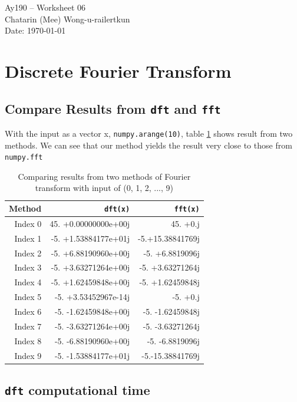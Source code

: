 \documentclass[11pt,letterpaper]{article}
\begin{document}
\begin{center}
\Large
Ay190 -- Worksheet 06 \\    %
Chatarin (Mee) Wong-u-railertkun\\
Date: \today
\end{center}

\section{Discrete Fourier Transform}

\subsection{Compare Results from \texttt{dft} and \texttt{fft}}
With the input as a vector x, \texttt{numpy.arange(10)}, table \ref{tab:compare} shows result from two methods. We can see that our method yields the result very close to those from \texttt{numpy.fft}

\begin{table}[h!]
	\centering
	\begin{tabular}{r || r | r}
		Method & \texttt{dft(x)} & \texttt{fft(x)} \\
		\hline
		\hline
		Index 0 & 45. +0.00000000e+00j & 45. +0.j \\
		Index 1 & -5. +1.53884177e+01j & -5.+15.38841769j \\
		Index 2 & -5. +6.88190960e+00j & -5. +6.8819096j \\
		Index 3 & -5. +3.63271264e+00j & -5. +3.63271264j \\
		Index 4 & -5. +1.62459848e+00j & -5. +1.62459848j \\
		Index 5 & -5. +3.53452967e-14j & -5. +0.j \\
		Index 6 & -5. -1.62459848e+00j & -5. -1.62459848j \\
		Index 7 & -5. -3.63271264e+00j & -5. -3.63271264j \\
		Index 8 & -5. -6.88190960e+00j & -5. -6.8819096j \\
		Index 9 & -5. -1.53884177e+01j & -5.-15.38841769j \\
		\hline
	\end{tabular}
	\caption{Comparing results from two methods of Fourier transform with input of (0, 1, 2, ..., 9)}
	\label{tab:compare}
\end{table}

\subsection{\texttt{dft} computational time}
\end{document}
